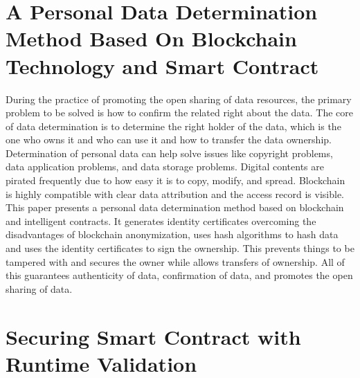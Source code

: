 \documentclass{article}
\begin{document}
\section{A Personal Data Determination Method Based On Blockchain Technology and Smart Contract \cite{Wang}}

During the practice of promoting the open sharing of data resources, the primary problem to be solved is how to confirm the related right about the data. The core of data determination is to determine the right holder of the data, which is the one who owns it and who can use it and how to transfer the data ownership. Determination of personal data can help solve issues like copyright problems, data application problems, and data storage problems. Digital contents are pirated frequently due to how easy it is to copy, modify, and spread. Blockchain is highly compatible with clear data attribution and the access record is visible. This paper presents a personal data determination method based on blockchain and intelligent contracts. It generates identity certificates overcoming the disadvantages of blockchain anonymization, uses hash algorithms to hash data and uses the identity certificates to sign the ownership. This prevents things to be tampered with and secures the owner while allows transfers of ownership. All of this guarantees authenticity of data, confirmation of data, and promotes the open sharing of data.

\section{Securing Smart Contract with Runtime Validation \cite{Li}}
\end{document}
